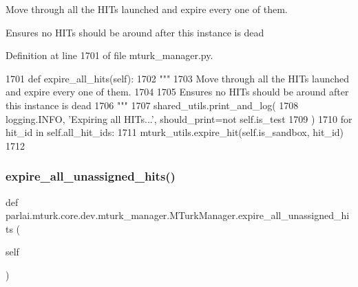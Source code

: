 \begin{DoxyVerb}Move through all the HITs launched and expire every one of them.

Ensures no HITs should be around after this instance is dead
\end{DoxyVerb}
 

Definition at line 1701 of file mturk\+\_\+manager.\+py.


\begin{DoxyCode}
1701     \textcolor{keyword}{def }expire\_all\_hits(self):
1702         \textcolor{stringliteral}{"""}
1703 \textcolor{stringliteral}{        Move through all the HITs launched and expire every one of them.}
1704 \textcolor{stringliteral}{}
1705 \textcolor{stringliteral}{        Ensures no HITs should be around after this instance is dead}
1706 \textcolor{stringliteral}{        """}
1707         shared\_utils.print\_and\_log(
1708             logging.INFO, \textcolor{stringliteral}{'Expiring all HITs...'}, should\_print=\textcolor{keywordflow}{not} self.is\_test
1709         )
1710         \textcolor{keywordflow}{for} hit\_id \textcolor{keywordflow}{in} self.all\_hit\_ids:
1711             mturk\_utils.expire\_hit(self.is\_sandbox, hit\_id)
1712 
\end{DoxyCode}
\mbox{\label{classparlai_1_1mturk_1_1core_1_1dev_1_1mturk__manager_1_1MTurkManager_a03219ffafb8bdb12abc9237c1b58c62b}} 
\subsubsection{\texorpdfstring{expire\+\_\+all\+\_\+unassigned\+\_\+hits()}{expire\_all\_unassigned\_hits()}}
{\footnotesize\ttfamily def parlai.\+mturk.\+core.\+dev.\+mturk\+\_\+manager.\+M\+Turk\+Manager.\+expire\+\_\+all\+\_\+unassigned\+\_\+hits (\begin{DoxyParamCaption}\item[{}]{self }\end{DoxyParamCaption})}

